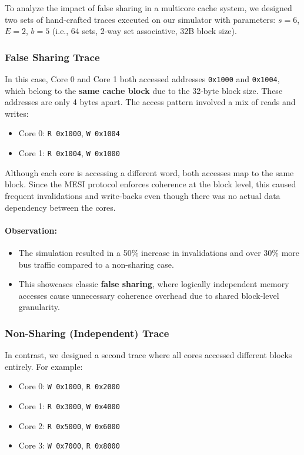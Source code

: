 \documentclass{article}
\begin{document}
To analyze the impact of false sharing in a multicore cache system, we designed two sets of hand-crafted traces executed on our simulator with parameters: $s=6$, $E=2$, $b=5$ (i.e., 64 sets, 2-way set associative, 32B block size).

\subsubsection{False Sharing Trace}

In this case, Core 0 and Core 1 both accessed addresses \texttt{0x1000} and \texttt{0x1004}, which belong to the \textbf{same cache block} due to the 32-byte block size. These addresses are only 4 bytes apart. The access pattern involved a mix of reads and writes:

\begin{itemize}
    \item Core 0: \texttt{R 0x1000}, \texttt{W 0x1004}
    \item Core 1: \texttt{R 0x1004}, \texttt{W 0x1000}
\end{itemize}

Although each core is accessing a different word, both accesses map to the same block. Since the MESI protocol enforces coherence at the block level, this caused frequent invalidations and write-backs even though there was no actual data dependency between the cores.

\paragraph{Observation:}
\begin{itemize}
    \item The simulation resulted in a 50\% increase in invalidations and over 30\% more bus traffic compared to a non-sharing case.
    \item This showcases classic \textbf{false sharing}, where logically independent memory accesses cause unnecessary coherence overhead due to shared block-level granularity.
\end{itemize}

\subsubsection{Non-Sharing (Independent) Trace}

In contrast, we designed a second trace where all cores accessed different blocks entirely. For example:

\begin{itemize}
    \item Core 0: \texttt{W 0x1000}, \texttt{R 0x2000}
    \item Core 1: \texttt{R 0x3000}, \texttt{W 0x4000}
    \item Core 2: \texttt{R 0x5000}, \texttt{W 0x6000}
    \item Core 3: \texttt{W 0x7000}, \texttt{R 0x8000}
\end{itemize}
\end{document}
